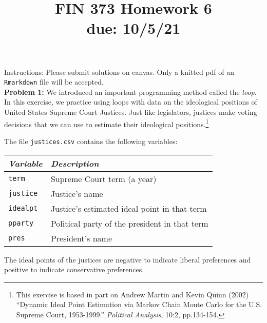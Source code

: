 \documentclass[11pt]{article}
\begin{document}
\title{FIN 373 Homework 6 \\ {\large due: \textbf{10/5/21}}}
\date{}
\maketitle

\vspace{-20mm}

\noindent Instructions: Please submit solutions on canvas.  Only a knitted pdf of an {\tt Rmarkdown} file will be accepted.
\\

\noindent \textbf{Problem 1:} We introduced an important programming method called the \textit{loop}.
In this exercise, we practice using loops 
with data on the ideological positions of United States
Supreme Court Justices.  Just like legislators, justices make voting decisions 
that we can use to estimate their ideological positions.\footnote{This exercise is based in part on Andrew Martin and Kevin Quinn (2002) ``Dynamic
  Ideal Point Estimation via Markov Chain Monte Carlo for the
  U.S. Supreme Court, 1953-1999.'' \textit{Political Analysis}, 10:2, pp.134-154.}
  
  
The file {\tt justices.csv} contains the following variables:

\vspace{1mm}
\begin{center}
\begin{tabular}{l p{8cm}}
 \hline
\textit{Variable} & \textit{Description} \\
\hline
{\tt term} &               Supreme Court term (a year) \\
{\tt justice} &            Justice's name \\
{\tt idealpt} &           Justice's estimated ideal point in that term \\
{\tt pparty} &             Political party of the president in that term \\
{\tt pres} &               President's name \\
\hline
\end{tabular}
\end{center}

The ideal points of the justices are negative to indicate liberal 
preferences and positive to indicate conservative preferences. 
\end{document}
